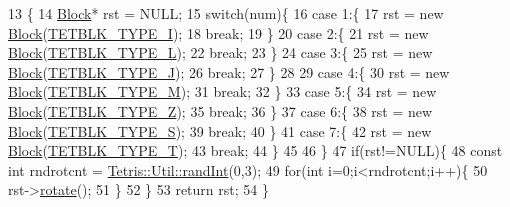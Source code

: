 \begin{DoxyCode}
13                                                    \{
14                 \hyperlink{class_tetris_1_1_block}{Block}* rst = NULL;
15                 \textcolor{keywordflow}{switch}(num)\{
16                     \textcolor{keywordflow}{case} 1:\{
17                         rst = \textcolor{keyword}{new} \hyperlink{class_tetris_1_1_block}{Block}(\hyperlink{_block_8h_ac9fe505a10c9ea541483202000c72dfe}{TETBLK\_TYPE\_I});
18                         \textcolor{keywordflow}{break};
19                     \}
20                     \textcolor{keywordflow}{case} 2:\{
21                         rst = \textcolor{keyword}{new} \hyperlink{class_tetris_1_1_block}{Block}(\hyperlink{_block_8h_aa30a45ef914d6bd7caf960c42af38197}{TETBLK\_TYPE\_L});
22                         \textcolor{keywordflow}{break};
23                     \}
24                     \textcolor{keywordflow}{case} 3:\{
25                         rst = \textcolor{keyword}{new} \hyperlink{class_tetris_1_1_block}{Block}(\hyperlink{_block_8h_a3a84ffcf3638f400ed5ebc303d152a94}{TETBLK\_TYPE\_J});
26                         \textcolor{keywordflow}{break};
27                     \}
28 
29                     \textcolor{keywordflow}{case} 4:\{
30                         rst = \textcolor{keyword}{new} \hyperlink{class_tetris_1_1_block}{Block}(\hyperlink{_block_8h_a6da1e2b8848e1a7b5a7ee687fd6492bd}{TETBLK\_TYPE\_M});
31                         \textcolor{keywordflow}{break};
32                     \}
33                     \textcolor{keywordflow}{case} 5:\{
34                         rst = \textcolor{keyword}{new} \hyperlink{class_tetris_1_1_block}{Block}(\hyperlink{_block_8h_a50283efc563e3ebe3b8ac84947491f5d}{TETBLK\_TYPE\_Z});
35                         \textcolor{keywordflow}{break};
36                     \}
37                     \textcolor{keywordflow}{case} 6:\{
38                         rst = \textcolor{keyword}{new} \hyperlink{class_tetris_1_1_block}{Block}(\hyperlink{_block_8h_afb6b4a709481a06422a9a9daedb334ee}{TETBLK\_TYPE\_S});
39                         \textcolor{keywordflow}{break};
40                     \}
41                     \textcolor{keywordflow}{case} 7:\{
42                         rst = \textcolor{keyword}{new} \hyperlink{class_tetris_1_1_block}{Block}(\hyperlink{_block_8h_aa624341303e91efd01c17dfb25d15010}{TETBLK\_TYPE\_T});
43                         \textcolor{keywordflow}{break};
44                     \}
45 
46                 \}
47                 \textcolor{keywordflow}{if}(rst!=NULL)\{
48                     \textcolor{keyword}{const} \textcolor{keywordtype}{int} rndrotcnt = \hyperlink{namespace_tetris_1_1_util_aa590e9fd847ac6e0c9bc6bf464b5a74b}{Tetris::Util::randInt}(0,3);
49                     \textcolor{keywordflow}{for}(\textcolor{keywordtype}{int} i=0;i<rndrotcnt;i++)\{
50                         rst->\hyperlink{class_tetris_1_1_block_a0d1eb57e6da91832ad983f7a4fa9ca04}{rotate}();
51                     \}
52                 \}
53                 \textcolor{keywordflow}{return} rst;
54             \}
\end{DoxyCode}
